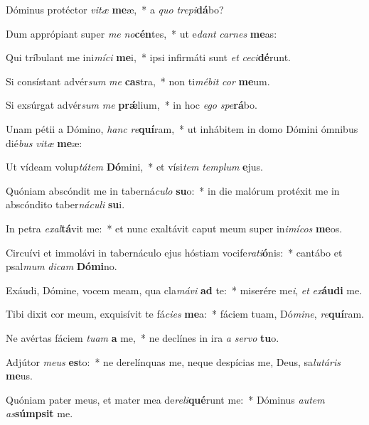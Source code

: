 \item Dóminus protéctor \textit{vi}\textit{tæ} \textbf{me}æ,~* a \textit{quo} \textit{tre}\textit{pi}\textbf{dá}bo?
\item Dum apprópiant super \textit{me} \textit{no}\textbf{cén}tes,~* ut e\textit{dant} \textit{car}\textit{nes} \textbf{me}as:
\item Qui tríbulant me ini\textit{mí}\textit{ci} \textbf{me}i,~* ipsi infirmáti sunt \textit{et} \textit{ce}\textit{ci}\textbf{dé}runt.
\item Si consístant advér\textit{sum} \textit{me} \textbf{cas}tra,~* non ti\textit{mé}\textit{bit} \textit{cor} \textbf{me}um.
\item Si exsúrgat advér\textit{sum} \textit{me} \textbf{prǽ}lium,~* in hoc \textit{e}\textit{go} \textit{spe}\textbf{rá}bo.
\item Unam pétii a Dómino, \textit{hanc} \textit{re}\textbf{quí}ram,~* ut inhábitem in domo Dómini ómnibus dié\textit{bus} \textit{vi}\textit{tæ} \textbf{me}æ:
\item Ut vídeam volup\textit{tá}\textit{tem} \textbf{Dó}mini,~* et vísi\textit{tem} \textit{tem}\textit{plum} \textbf{e}jus.
\item Quóniam abscóndit me in taberná\textit{cu}\textit{lo} \textbf{su}o:~* in die malórum protéxit me in abscóndito taber\textit{ná}\textit{cu}\textit{li} \textbf{su}i.
\item In petra \textit{ex}\textit{al}\textbf{tá}vit me:~* et nunc exaltávit caput meum super in\textit{i}\textit{mí}\textit{cos} \textbf{me}os.
\item Circuívi et immolávi in tabernáculo ejus hóstiam vocife\textit{ra}\textit{ti}\textbf{ó}nis:~* cantábo et psal\textit{mum} \textit{di}\textit{cam} \textbf{Dó}\textbf{mi}no.
\item Exáudi, Dómine, vocem meam, qua cla\textit{má}\textit{vi} \textbf{ad} te:~* miserére me\textit{i}, \textit{et} \textit{ex}\textbf{áu}\textbf{di} me.
\item Tibi dixit cor meum, exquisívit te fá\textit{ci}\textit{es} \textbf{me}a:~* fáciem tuam, Dó\textit{mi}\textit{ne}, \textit{re}\textbf{quí}ram.
\item Ne avértas fáciem \textit{tu}\textit{am} \textbf{a} me,~* ne declínes in ira \textit{a} \textit{ser}\textit{vo} \textbf{tu}o.
\item Adjútor \textit{me}\textit{us} \textbf{es}to:~* ne derelínquas me, neque despícias me, Deus, sa\textit{lu}\textit{tá}\textit{ris} \textbf{me}us.
\item Quóniam pater meus, et mater mea de\textit{re}\textit{li}\textbf{qué}runt me:~* Dóminus \textit{au}\textit{tem} \textit{as}\textbf{súmp}\textbf{sit} me.
